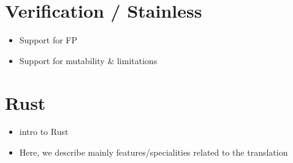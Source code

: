 
\section{Verification / Stainless}

\begin{itemize}
\tightlist
\item
  Support for FP
\item
  Support for mutability \& limitations
\end{itemize}

\section{Rust}

\begin{itemize}
\tightlist
\item
  intro to Rust
\item
  Here, we describe mainly features/specialities related to the
  translation
\end{itemize}
